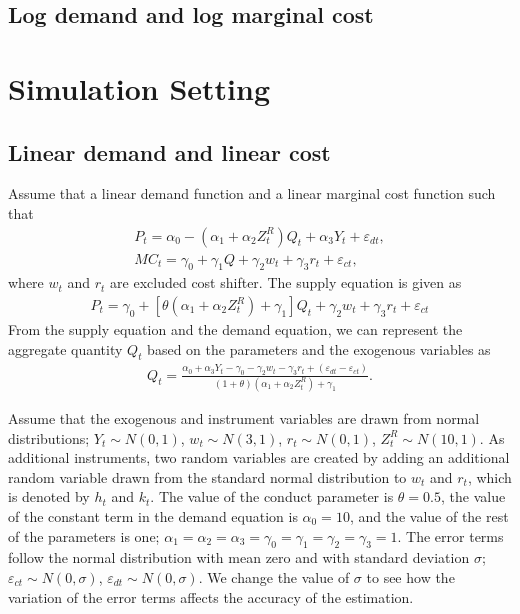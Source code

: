 \documentclass[11pt, a4paper]{article}
\begin{document}
\subsection{Log demand and log marginal cost}

\section{Simulation Setting}

\subsection{Linear demand and linear cost}
Assume that a linear demand function and a linear marginal cost function such that
\begin{align}
    P_t = \alpha_0 - (\alpha_1 + \alpha_2Z^R_t)Q_t + \alpha_3 Y_t + \varepsilon_{dt},\\
    MC_t = \gamma_0  + \gamma_1 Q + \gamma_2 w_t + \gamma_3 r_t + \varepsilon_{ct},
\end{align}
where $w_t$ and $r_t$ are excluded cost shifter.
The supply equation is given as
\begin{align}
    P_t = \gamma_0 + [\theta(\alpha_1 + \alpha_2Z^R_t)+ \gamma_1] Q_t   + \gamma_2 w_t + \gamma_3 r_t + \varepsilon_{ct}
\end{align}
From the supply equation and the demand equation, we can represent the aggregate quantity $Q_t$ based on the parameters and the exogenous variables as   
\begin{align}
    Q_t =  \frac{\alpha_0 + \alpha_3 Y_t - \gamma_0 - \gamma_2 w_t - \gamma_3 r_t + (\varepsilon_{dt} - \varepsilon_{ct})}{(1 + \theta) (\alpha_1 + \alpha_2Z^R_t) + \gamma_1}.
\end{align}

Assume that the exogenous and instrument variables are drawn from normal distributions; $ Y_t \sim N(0,1)$, $w_t \sim N (3, 1)$, $r_t \sim N (0, 1)$, $ Z^R_t \sim N (10, 1)$.
As additional instruments, two random variables are created by adding an additional random variable drawn from the standard normal distribution to $w_t$ and $r_t$, which is denoted by $h_t$ and $k_t$.
The value of the conduct parameter is $\theta = 0.5$, the value of the constant term in the demand equation is $\alpha_0 = 10$, and the value of the rest of the parameters is one; $\alpha_1 = \alpha_2 = \alpha_3 = \gamma_0 = \gamma_1 = \gamma_2  = \gamma_3 = 1$. 
The error terms follow the normal distribution with mean zero and with standard deviation $\sigma$; $\varepsilon_{ct}\sim N(0,\sigma)$, $\varepsilon_{dt} \sim N(0,\sigma)$.
We change the value of $\sigma$ to see how the variation of the error terms affects the accuracy of the estimation.
\end{document}
